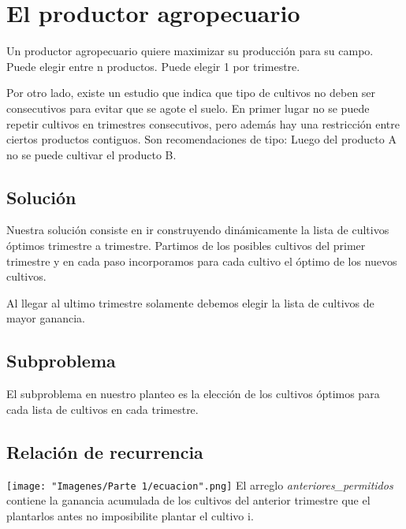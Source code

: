 \section{El productor agropecuario}
Un productor agropecuario quiere maximizar su producción para su campo. Puede elegir entre n productos. Puede elegir 1 por trimestre. \newline

Por otro lado, existe un estudio que indica que tipo de cultivos no deben ser consecutivos para evitar que se agote el suelo. En primer lugar no se puede repetir cultivos en trimestres consecutivos, pero además hay una restricción entre ciertos productos contiguos.\newline
Son recomendaciones de tipo: Luego del producto A no se puede cultivar el producto B.

\subsection{Solución}
Nuestra solución consiste en ir construyendo dinámicamente la lista de cultivos óptimos trimestre a trimestre. Partimos de los posibles cultivos del primer trimestre y en cada paso incorporamos para cada cultivo el óptimo de los nuevos cultivos.\newline 

Al llegar al ultimo trimestre solamente debemos elegir la lista de cultivos de mayor ganancia.

\subsection{Subproblema}
El subproblema en nuestro planteo es la elección de los cultivos óptimos para cada lista de cultivos en cada trimestre.

\subsection{Relación de recurrencia}
\texttt{[image: "Imagenes/Parte 1/ecuacion".png]}\newline
\newline
El arreglo \emph{anteriores\_permitidos} contiene la ganancia acumulada de los cultivos del anterior trimestre que el plantarlos antes no imposibilite plantar el cultivo i.

